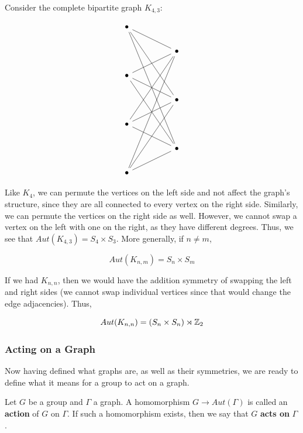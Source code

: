 \begin{example}
    Consider the complete bipartite graph $K_{4,3}$:

    \[\begin{tikzcd}
        \bullet \\
        && \bullet \\
        \bullet \\
        && \bullet \\
        \bullet \\
        && \bullet \\
        \bullet
        \arrow[no head, from=1-1, to=2-3]
        \arrow[no head, from=1-1, to=4-3]
        \arrow[no head, from=1-1, to=6-3]
        \arrow[no head, from=3-1, to=2-3]
        \arrow[no head, from=3-1, to=4-3]
        \arrow[no head, from=3-1, to=6-3]
        \arrow[no head, from=5-1, to=2-3]
        \arrow[no head, from=5-1, to=4-3]
        \arrow[no head, from=5-1, to=6-3]
        \arrow[no head, from=7-1, to=2-3]
        \arrow[no head, from=7-1, to=4-3]
        \arrow[no head, from=7-1, to=6-3]
    \end{tikzcd}\]

    Like $K_4$, we can permute the vertices on the left side and not affect the graph's structure, since they are all connected to every vertex on the right side. Similarly, we can permute the vertices on the right side as well. However, we cannot swap a vertex on the left with one on the right, as they have different degrees. Thus, we see that $Aut(K_{4,3}) = S_4 \times S_3$. More generally, if $n \neq m$,

    \[Aut(K_{n,m}) = S_n \times S_m\]

    If we had $K_{n,n}$, then we would have the addition symmetry of swapping the left and right sides (we cannot swap individual vertices since that would change the edge adjacencies). Thus, 

    \[Aut(K_{n,n}) = (S_n \times S_n) \rtimes \mathbb{Z}_2\]
\end{example}

\subsubsection{Acting on a Graph}

Now having defined what graphs are, as well as their symmetries, we are ready to define what it means for a group to act on a graph.

\begin{defn}
    Let $G$ be a group and $\Gamma$ a graph. A homomorphism $G \to Aut(\Gamma)$ is called an \textbf{action} of $G$ on $\Gamma$. If such a homomorphism exists, then we say that $G$ \textbf{acts on} $\Gamma$. 
\end{defn}


